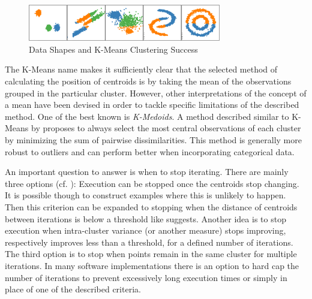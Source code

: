 \begin{figure}[h]
\centering
\includegraphics[width=0.75\textwidth]{images/kmeans_suitable_shapes.png}
\caption{Data Shapes and K-Means Clustering Success}
\label{img:k_means_cluster_success}
\end{figure}

 The K-Means name makes it sufficiently clear that the selected method of calculating the position of centroids is by taking the mean of the observations grouped in the particular cluster. However, other interpretations of the concept of a mean have been devised in order to tackle specific limitations of the described method. One of the best known is \textit{K-Medoids}. A method described similar to K-Means by \cite{park2009simple} proposes to always select the most central observations of each cluster by minimizing the sum of pairwise dissimilarities. This method is generally more robust to outliers and can perform better when incorporating categorical data.

 An important question to answer is when to stop iterating. There are mainly three options (cf. \cite{cleuziou2008extended}): Execution can be stopped once the centroids stop changing. It is possible though to construct examples where this is unlikely to happen. Then this criterion can be expanded to stopping when the distance of centroids between iterations is below a threshold like \cite{lloyd1982least} suggests. Another idea is to stop execution when intra-cluster variance (or another measure) stops improving, respectively improves less than a threshold, for a defined number of iterations. The third option is to stop when points remain in the same cluster for multiple iterations. In many software implementations there is an option to hard cap the number of iterations to prevent excessively long execution times or simply in place of one of the described criteria.\\

